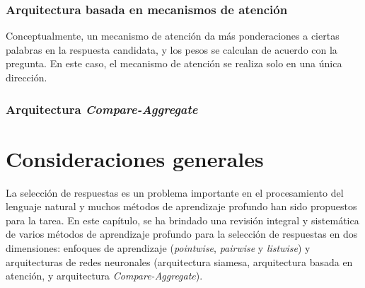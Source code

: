 \subsubsection{Arquitectura basada en mecanismos de atención}

Conceptualmente, un mecanismo de atención da más ponderaciones a ciertas palabras en la respuesta candidata, y los pesos se calculan de acuerdo con la pregunta. En este caso, el mecanismo de atención se realiza solo en una única dirección.

\subsubsection{Arquitectura \textit{Compare-Aggregate}}


\section{Consideraciones generales}

La selección de respuestas es un problema importante en el procesamiento del lenguaje natural y muchos métodos de aprendizaje profundo han sido propuestos para la tarea. En este capítulo, se ha brindado una revisión integral y sistemática de varios métodos de aprendizaje profundo para la selección de respuestas en dos dimensiones: enfoques de aprendizaje (\textit{pointwise}, \textit{pairwise} y \textit{listwise}) y arquitecturas de redes neuronales (arquitectura siamesa, arquitectura basada en atención, y arquitectura \textit{Compare-Aggregate}).